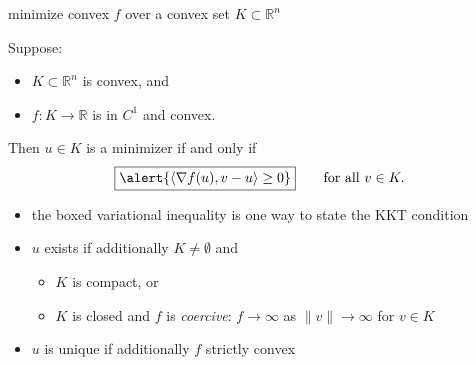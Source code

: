 \documentclass[aspectratio=169,10pt]{beamer}
\newcommand{\RR}{{\mathbb{R}}}
\newcommand{\ip}[2]{\left\langle #1, #2 \right\rangle}
\newcommand{\lc}{{\text{\large $\circ$}}}
\begin{document}
\begin{frame}{minimize convex $f$ over a convex set $K\subset\mathbb{R}^n$}

\begin{theorem}
\begin{minipage}{0.6\linewidth}
Suppose:
\begin{itemize}
\item $K\subset\RR^n$ is convex, and
\item $f : K \to \RR$ is in $C^1$ \alert{and convex}.
\end{itemize}
Then $u\in K$ is a minimizer \alert{if and only if}
  $$\boxed{\alert{\ip{\nabla f(u)}{v-u} \ge 0}} \qquad\text{for all } v\in K.$$
\end{minipage}
\hfill
\begin{minipage}{0.36\linewidth}
  \centering
  \scalebox{1.0}{}
\end{minipage}
\end{theorem}

\begin{itemize}
\item the boxed \alert{variational inequality} is one way to state the KKT condition
\item $u$ exists if additionally $K\ne \emptyset$ and
    \begin{itemize}
    \item[$\lc$] $K$ is compact, or
    \item[$\lc$] $K$ is closed and $f$ is \emph{coercive}: $f\to \infty$ as $\|v\|\to \infty$ for $v\in K$
    \end{itemize}
\item $u$ is unique if additionally $f$ strictly convex
\end{itemize}
\end{frame}
\end{document}
